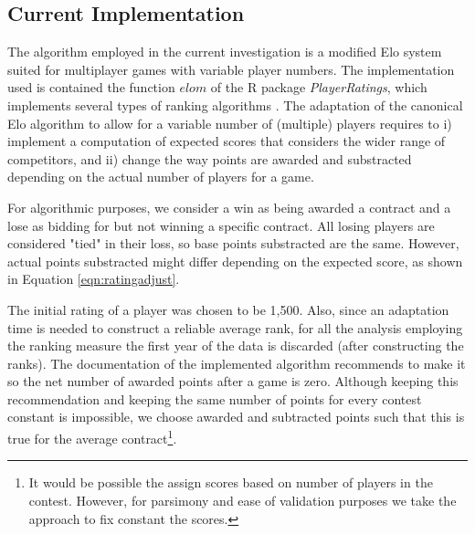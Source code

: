 \subsection{Current Implementation}
The algorithm employed in the current investigation is a modified  Elo system suited for multiplayer games with variable player numbers. The implementation used is contained the function $elom$ of the R package \textit{PlayerRatings}, which implements several types of ranking algorithms \citep{stephenson2020package}. The adaptation of the canonical Elo algorithm to allow for a variable number of (multiple) players requires to i) implement a computation of expected scores that considers the wider range of competitors, and ii) change the way points are awarded and substracted depending on the actual number of players for a game.

For algorithmic purposes, we consider a win as being awarded a contract and a lose as bidding for but not winning a specific contract. All losing players are considered "tied" in their loss, so base points substracted are the same. However, actual points substracted might differ depending on the expected score, as shown in Equation \ref{eqn:ratingadjust}.

The initial rating of a player was chosen to be 1,500. Also, since an adaptation time is needed to construct a reliable average rank, for all the analysis employing the ranking measure the first year of the data is discarded (after constructing the ranks). The documentation of the implemented algorithm recommends to make it so the net number of awarded points after a game is zero. Although keeping this recommendation and keeping the same number of points for every contest constant is impossible, we choose awarded and subtracted points such that this is true for the average contract\footnote{It would be possible the assign scores based on number of players in the contest. However, for parsimony and ease of validation purposes we take the approach to fix constant the scores.}.


